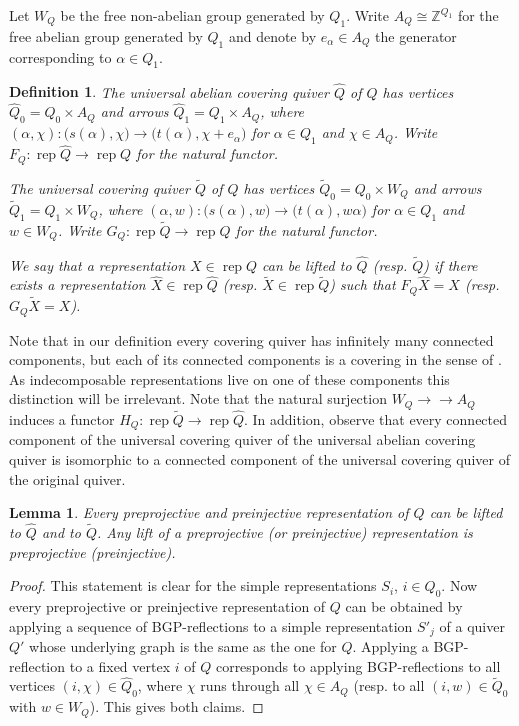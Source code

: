 \documentclass{amsart}
\newtheorem{definition}[theorem]{Definition}
\newtheorem{lemma}[theorem]{Lemma}
\numberwithin{equation}{section}
\newcommand{\ZZ}{\mathbb{Z}}
\newcommand{\onto}{\to\!\!\!\!\!\to}
\newcommand{\rep}{\operatorname{rep}}
\begin{document}
Let $W_Q$ be the free non-abelian group generated by $Q_1$.  
Write $A_Q\cong \ZZ^{Q_1}$ for the free abelian group generated by $Q_1$ and denote by $e_\alpha\in A_Q$ the generator corresponding to $\alpha\in Q_1$. 
\begin{definition}
  \label{def:covering quivers}
  The \emph{universal abelian covering quiver} $\hat Q$ of $Q$ has vertices $\hat Q_0=Q_0\times A_Q$ and arrows $\hat Q_1=Q_1\times A_Q$, where $(\alpha,\chi):\big(s(\alpha),\chi\big)\to\big(t(\alpha),\chi+e_\alpha\big)$ for $\alpha\in Q_1$ and $\chi\in A_Q$.
  Write $F_Q:\rep \hat Q\to\rep Q$ for the natural functor. 

  The \emph{universal covering quiver} $\widetilde Q$ of $Q$ has vertices $\widetilde Q_0=Q_0\times W_Q$ and arrows $\widetilde Q_1=Q_1\times W_Q$, where $(\alpha,w):\big(s(\alpha),w\big)\to\big(t(\alpha),w\alpha\big)$ for $\alpha\in Q_1$ and $w\in W_Q$.
  Write $G_Q:\rep\widetilde Q\to\rep Q$ for the natural functor. 

  We say that a representation $X\in\rep Q$ can be \emph{lifted} to $\hat Q$ (resp. $\widetilde Q$) if there exists a representation $\hat X\in\rep \hat Q$ (resp. $\widetilde X\in\rep \widetilde Q$) such that $F_Q\hat X=X$ (resp. $G_Q \widetilde X=X$).
\end{definition}

Note that in our definition every covering quiver has infinitely many connected components, but each of its connected components is a covering in the sense of \cite{gab}.
As indecomposable representations live on one of these components this distinction will be irrelevant.
Note that the natural surjection $W_Q\onto A_Q$ induces a functor $H_Q:\rep \widetilde Q\to\rep \hat Q$.
In addition, observe that every connected component of the universal covering quiver of the universal abelian covering quiver is isomorphic to a connected component of the universal covering quiver of the original quiver.

\begin{lemma}
  \label{le:lifts of transjectives}
  Every preprojective and preinjective representation of $Q$ can be lifted to $\hat Q$ and to $\widetilde Q$. Any lift of a preprojective (or preinjective) representation is preprojective (preinjective). 
\end{lemma}
\begin{proof}
  This statement is clear for the simple representations $S_i$, $i\in Q_0$.
  Now every preprojective or preinjective representation of $Q$ can be obtained by applying a sequence of BGP-reflections \cite{bgp} to a simple representation $S'_j$ of a quiver $Q'$ whose underlying graph is the same as the one for $Q$.
  Applying a BGP-reflection to a fixed vertex $i$ of $Q$ corresponds to applying BGP-reflections to all vertices $(i,\chi)\in\hat Q_0$, where $\chi$ runs through all $\chi\in A_Q$ (resp. to all $(i,w)\in \tilde Q_0$ with $w\in W_Q$).
  This gives both claims.
\end{proof}
\end{document}
